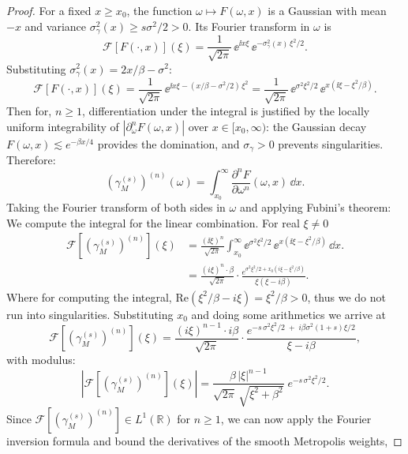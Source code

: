 \begin{proof}
    For a fixed $x \geq x_0$, the function $\omega \mapsto F(\omega, x)$ is a Gaussian with mean $-x$ and variance $\sigma_\gamma^2(x) \geq s \sigma^2 / 2 > 0$. Its Fourier transform in $\omega$ is
    \[
    \mathcal{F}[F(\cdot, x)](\xi) = \frac{1}{\sqrt{2\pi}}\,\ee^{\ii x\xi}\, \ee^{-\sigma_\gamma^2(x)\, \xi^2/2}.
    \]
    Substituting $\sigma_\gamma^2(x) = 2x / \beta  - \sigma^2$:
    \[
    \mathcal{F}[F(\cdot, x)](\xi) = \frac{1}{\sqrt{2\pi}}\,\ee^{\ii x\xi - (x/\beta - \sigma^2/2)\,\xi^2} = \frac{1}{\sqrt{2\pi}}\,\ee^{\sigma^2\xi^2/2}\, \ee^{x(\ii\xi - \xi^2/\beta)}.
    \]
    Then for, $n \geq 1$, differentiation under the integral is justified by the locally uniform integrability of $|\partial_\omega^n F(\omega, x)|$ over $x \in [x_0, \infty)$: the Gaussian decay $F(\omega, x) \lesssim e^{-\beta x/4}$ provides the domination, and $\sigma_\gamma > 0$ prevents singularities. Therefore:
    \[
    \left(\gamma_M^{(s)}\right)^{(n)}(\omega) = \int_{x_0}^\infty \frac{\partial^n F}{\partial \omega^n}(\omega, x)\, \dd x.
    \]
    Taking the Fourier transform of both sides in $\omega$ and applying Fubini's theorem:
    We compute the integral for the linear combination. For real $\xi \neq 0$
    \begin{equation*}
        \begin{split}
            \mathcal{F}\left[\left(\gamma_M^{(s)}\right)^{(n)}\right](\xi) &= \frac{(\ii\xi)^n}{\sqrt{2\pi}} \int_{x_0}^\infty \ee^{\sigma^2\xi^2/2}\, \ee^{x(\ii\xi - \xi^2/\beta)}\, \dd x. \\
            &= \frac{(i\xi)^n \cdot \beta}{\sqrt{2\pi}} \cdot \frac{e^{\sigma^2\xi^2/2 + x_0(i\xi - \xi^2/\beta)}}{\xi(\xi - i\beta)}.
        \end{split}
    \end{equation*}
    Where for computing the integral, $\mathrm{Re}(\xi^2/\beta - i\xi) = \xi^2/\beta > 0$, thus we do not run into singularities.
    Substituting $x_0$ and doing some arithmetics we arrive at
    \[
    \mathcal{F}[(\gamma_M^{(s)})^{(n)}](\xi) = \frac{(i\xi)^{n-1} \cdot i\beta}{\sqrt{2\pi}} \cdot \frac{e^{-s\,\sigma^2\xi^2/2\; +\; i\beta\sigma^2(1+s)\xi/2}}{\xi - i\beta},
    \]
    with modulus:
    \[
    \left|\mathcal{F}[(\gamma_M^{(s)})^{(n)}](\xi)\right| = \frac{\beta\, |\xi|^{n-1}}{\sqrt{2\pi}\,\sqrt{\xi^2 + \beta^2}}\; e^{-s\,\sigma^2\xi^2/2}.
    \]
    Since $\mathcal{F}[(\gamma_M^{(s)})^{(n)}] \in L^1(\mathbb{R})$ for $n \geq 1$, we can now apply the Fourier inversion formula and bound the derivatives of the smooth Metropolis weights,

\end{proof}

